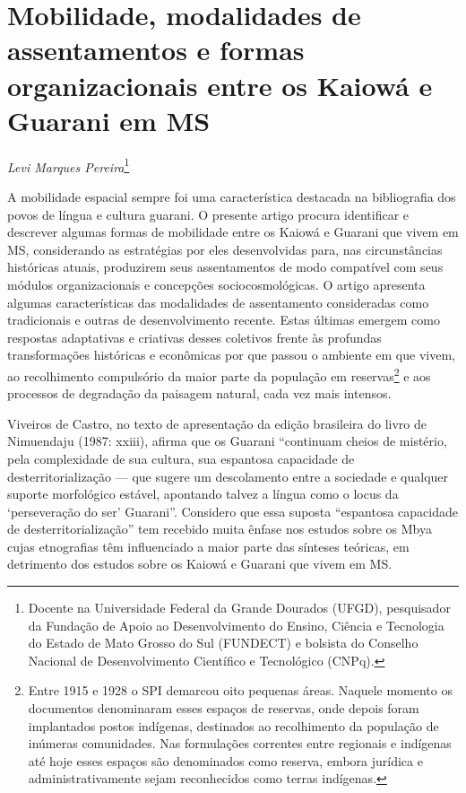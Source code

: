  

\chapter{Mobilidade, modalidades de assentamentos e formas organizacionais entre
os Kaiowá e Guarani em MS}
\begin{flushright}
\emph{Levi Marques Pereira}\footnote{Docente na Universidade Federal da
Grande Dourados (UFGD), pesquisador da Fundação de Apoio ao Desenvolvimento do Ensino, Ciência e Tecnologia do Estado de Mato Grosso do Sul (FUNDECT) e bolsista do Conselho Nacional de Desenvolvimento Científico e Tecnológico (CNPq).} 
\end{flushright}

A mobilidade espacial sempre foi uma característica destacada na
bibliografia dos povos de língua e cultura guarani. O presente artigo
procura identificar e descrever algumas formas de mobilidade entre os
Kaiowá e Guarani que vivem em MS, considerando as estratégias por eles
desenvolvidas para, nas circunstâncias históricas atuais, produzirem
seus assentamentos de modo compatível com seus módulos organizacionais
e concepções sociocosmológicas. O artigo apresenta algumas
características das modalidades de assentamento consideradas como
tradicionais e outras de desenvolvimento recente. Estas últimas emergem
como respostas adaptativas e criativas desses coletivos frente às
profundas transformações históricas e econômicas por que passou o
ambiente em que vivem, ao recolhimento compulsório da maior parte da
população em reservas\footnote{Entre 1915 e 1928 o SPI demarcou oito
pequenas áreas. Naquele momento os documentos denominaram esses espaços
de reservas, onde depois foram implantados postos indígenas, destinados
ao recolhimento da população de inúmeras comunidades. Nas formulações
correntes entre regionais e indígenas até hoje esses espaços são
denominados como reserva, embora jurídica e administrativamente sejam
reconhecidos como terras indígenas.\par } e aos processos de degradação
da paisagem natural, cada vez mais intensos.

Viveiros de Castro, no texto de apresentação da edição brasileira do
livro de Nimuendaju (1987: xxiii), afirma que os Guarani ``continuam
cheios de mistério, pela complexidade de sua cultura, sua espantosa
capacidade de desterritorialização — que sugere um descolamento entre a
sociedade e qualquer suporte morfológico estável, apontando talvez a
língua como o locus da ‘perseveração do ser’ Guarani''. Considero que
essa suposta ``espantosa capacidade de desterritorialização'' tem
recebido muita ênfase nos estudos sobre os Mbya cujas etnografias têm
influenciado a maior parte das sínteses teóricas, em detrimento dos
estudos sobre os Kaiowá e Guarani que vivem em MS. 

